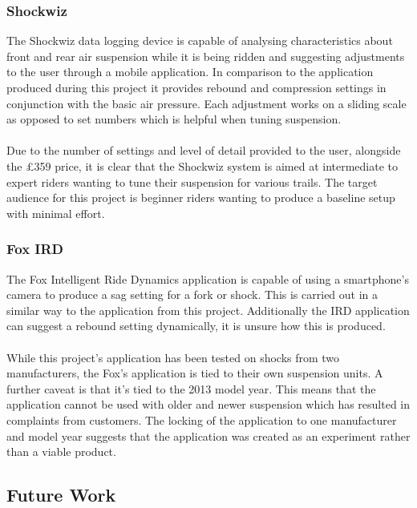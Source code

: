 		\subsubsection{Shockwiz}
			The Shockwiz data logging device \citep{quarq2017shockwiz} is capable of analysing characteristics about front and rear air suspension while it is being ridden and suggesting adjustments to the user through a mobile application. In comparison to the application produced during this project it provides rebound and compression settings in conjunction with the basic air pressure. Each adjustment works on a sliding scale as opposed to set numbers which is helpful when tuning suspension.
			\\\\
			Due to the number of settings and level of detail provided to the user, alongside the £359 price, it is clear that the Shockwiz system is aimed at intermediate to expert riders wanting to tune their suspension for various trails. The target audience for this project is beginner riders wanting to produce a baseline setup with minimal effort. 
		\subsubsection{Fox IRD}
			The Fox Intelligent Ride Dynamics application \cite{fox2015ird} is capable of using a smartphone's camera to produce a sag setting for a fork or shock. This is carried out in a similar way to the application from this project. Additionally the IRD application can suggest a rebound setting dynamically, it is unsure how this is produced.
			\\\\
			While this project's application has been tested on shocks from two manufacturers, the Fox's application is tied to their own suspension units. A further caveat is that it's tied to the 2013 model year. This means that the application cannot be used with older and newer suspension which has resulted in complaints from customers. The locking of the application to one manufacturer and model year suggests that the application was created as an experiment rather than a viable product.
	\subsection{Future Work}\label{sec:conclusion_future_work}
